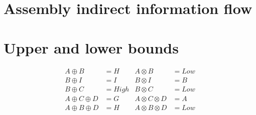 \section{Assembly indirect information flow}

\section{Upper and lower bounds}

\begin{equation}
\begin{aligned}
A \oplus B &= H          & A \otimes B &= Low \\
B \oplus I &= I          & B \otimes I &= B \\
B \oplus C &= High       & B \otimes C &= Low \\
A \oplus C \oplus D &= G & A \otimes C \otimes D &= A \\
A \oplus B \oplus D &= H & A \otimes B \otimes D &= Low
\end{aligned}
\end{equation}


